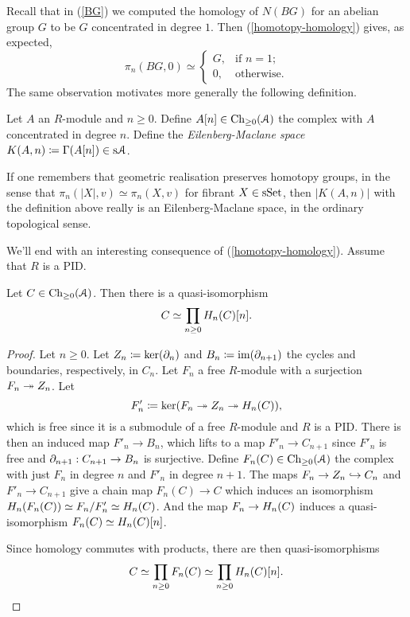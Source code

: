 \begin{remark}
  Recall that in (\ref{BG}) we computed the homology of $N(BG)$ for an
  abelian group $G$ to be $G$ concentrated in degree $1$. Then
  (\ref{homotopy-homology}) gives, as expected,
  \[
  \pi_n(BG,0) \simeq
  \begin{cases}
    G, & \text{if } n = 1; \\
    0, & \text{otherwise}.
  \end{cases}
  \]
  The same observation motivates more generally the following
  definition.
\end{remark}

\begin{definition}
  Let $A$ an $R$-module and $n \ge 0$. Define $A[n] \in \mathrm{Ch}_{\ge
    0}(\mathcal{A})$ the complex with $A$ concentrated in degree $n$. Define
  the \textit{Eilenberg-Maclane space} $K(A,n) \coloneqq \Gamma(A[n])
  \in \mathrm{s}\mathcal{A}$.
\end{definition}

\begin{remark}
  If one remembers that geometric realisation preserves homotopy
  groups, in the sense that $\pi_n(|X|,v) \simeq \pi_n(X,v)$ for
  fibrant $X \in \mathrm{s}\mathrm{Set}$, then $|K(A,n)|$ with the definition above
  really is an Eilenberg-Maclane space, in the ordinary topological
  sense.
\end{remark}

We'll end with an interesting consequence of
(\ref{homotopy-homology}). Assume that $R$ is a PID.

\begin{lemma}
  \label{quasi-homology}
  Let $C \in \mathrm{Ch}_{\ge 0}(\mathcal{A})$. Then there is a quasi-isomorphism
  \[
  C \simeq \prod_{n \ge 0} H_n(C)[n].
  \]
\end{lemma}

\begin{proof}
  Let $n \ge 0$. Let $Z_n \coloneqq \ker(\partial_n)$ and $B_n \coloneqq
  \operatorname{im}(\partial_{n+1})$ the cycles and boundaries, respectively, in
  $C_n$. Let $F_n$ a free $R$-module with a surjection $F_n \twoheadrightarrow
  Z_n$. Let
  \[
  F'_n \coloneqq \ker(F_n \twoheadrightarrow Z_n \twoheadrightarrow H_n(C)),
  \]
  which is free since it is a submodule of a free $R$-module and $R$
  is a PID. There is then an induced map $F'_n \to B_n$, which lifts
  to a map $F'_n \to C_{n+1}$ since $F'_n$ is free and $\partial_{n+1} :
  C_{n+1} \to B_n$ is surjective. Define $F_n(C) \in \mathrm{Ch}_{\ge 0}(\mathcal{A})$
  the complex with just $F_n$ in degree $n$ and $F'_n$ in degree
  $n+1$. The maps $F_n \to Z_n \hookrightarrow C_n$ and $F'_n \to C_{n+1}$ give a
  chain map $F_n(C) \to C$ which induces an isomorphism $H_n(F_n(C))
  \simeq F_n/F'_n \simeq H_n(C)$. And the map $F_n \to H_n(C)$
  induces a quasi-isomorphism $F_n(C) \simeq H_n(C)[n]$.

  Since homology commutes with products, there are then
  quasi-isomorphisms
  \[
  C \simeq \prod_{n \ge 0} F_n(C) \simeq \prod_{n \ge 0}
  H_n(C)[n]. \qedhere
  \]
\end{proof}

